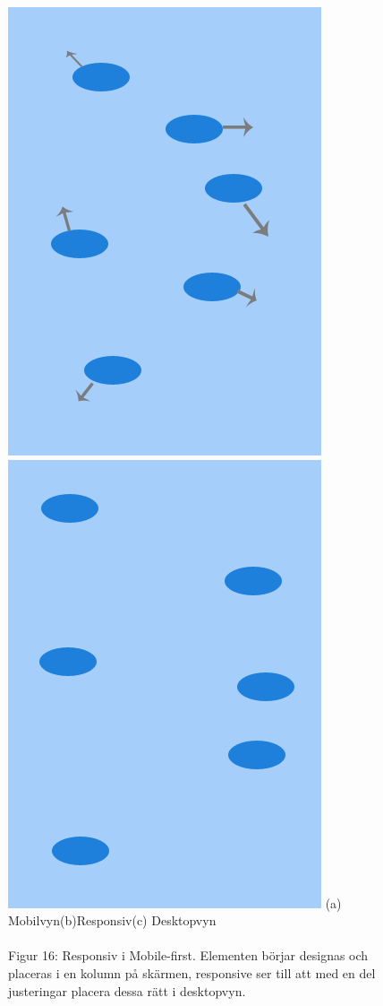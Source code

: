 \documentclass[11pt]{article}
\begin{document}
\begin{figure}[H]
{\includegraphics[scale=0.27]{pics/responsiv.png}\hspace{2em}%
\includegraphics[scale=0.27]{pics/desktop.png}%
}
\hspace{2cm}(a) Mobilvyn\hspace{2.3cm}(b)Responsiv\hspace{2.1cm}(c) Desktopvyn
\\\\
\hspace{0.15cm}Figur 16: Responsiv i Mobile-first. Elementen börjar designas och placeras i en kolumn på skärmen, responsive ser till att med en del justeringar placera dessa rätt i desktopvyn.
\end{figure}
\end{document}
